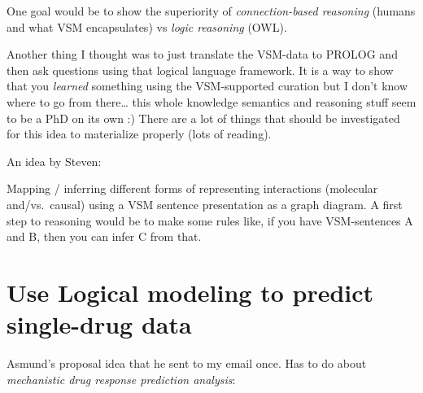 \documentclass[
  12pt,
]{book}
\begin{document}
One goal would be to show the superiority of \emph{connection-based reasoning}
(humans and what VSM encapsulates) vs \emph{logic reasoning} (OWL).

Another thing I thought was to just translate the VSM-data to PROLOG
and then ask questions using that logical language framework. It is a way to show
that you \emph{learned} something using the VSM-supported curation but I don't know
where to go from there\ldots{} this whole knowledge semantics and reasoning stuff
seem to be a PhD on its own :) There are a lot of things that should
be investigated for this idea to materialize properly (lots of reading).

An idea by Steven:

Mapping / inferring different forms of representing interactions (molecular
and/vs.~causal) using a VSM sentence presentation as a graph diagram. A first
step to reasoning would be to make some rules like, if you have VSM-sentences
A and B, then you can infer C from that.

\hypertarget{use-logical-modeling-to-predict-single-drug-data}{%
\section{Use Logical modeling to predict single-drug data}\label{use-logical-modeling-to-predict-single-drug-data}}

Asmund's proposal idea that he sent to my email once. Has to do about \emph{mechanistic drug response prediction analysis}:
\end{document}
